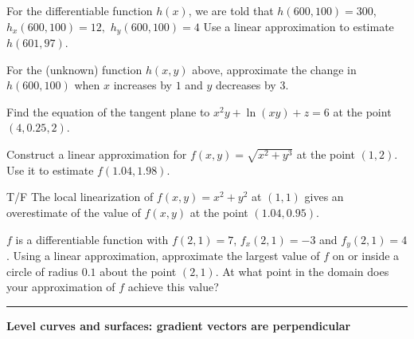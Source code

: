 \documentclass[12pt,letterpaper,noanswers]{exam}
\begin{document}
\begin{questions}
\item For the differentiable function $h(x)$, we are told that $h(600, 100) = 300$, $h_x(600,100) = 12,$ $h_y(600,100) = 4$  Use a linear approximation to estimate $h(601,97)$.
\vspace{0.5in}

\item For the (unknown) function $h(x,y)$ above, approximate the change in $h(600,100)$ when $x$ increases by $1$ and $y$ decreases by $3$.
\vspace{0.5in}



\item Find the equation of the tangent plane to $x^2 y + \ln(xy) + z = 6$ at the point $(4,0.25,2)$.
\vspace{1in}

\item Construct a linear approximation for $f(x,y) = \sqrt{x^2+y^3}$ at the point $(1,2)$.  Use it to estimate $f(1.04, 1.98)$.
\vspace{1in}

\item T/F The local linearization of $f(x,y) = x^2+y^2$ at $(1,1)$ gives an overestimate of the value of $f(x,y)$ at the point $(1.04, 0.95)$.
\vspace{1in}

\item $f$ is a differentiable function with $f(2,1)=7$, $f_x(2,1) = -3$ and $f_y(2,1) = 4$.  Using a linear approximation, approximate the largest value of $f$ on or inside a circle of radius $0.1$ about the point $(2,1)$.  At what point in the domain does your approximation of $f$ achieve this value?
\vspace{1in}


\end{questions}

\vspace{0.2cm}
\hrule
\vspace{0.2cm}

\noindent\textbf{Level curves and surfaces: gradient vectors are perpendicular}
\end{document}
